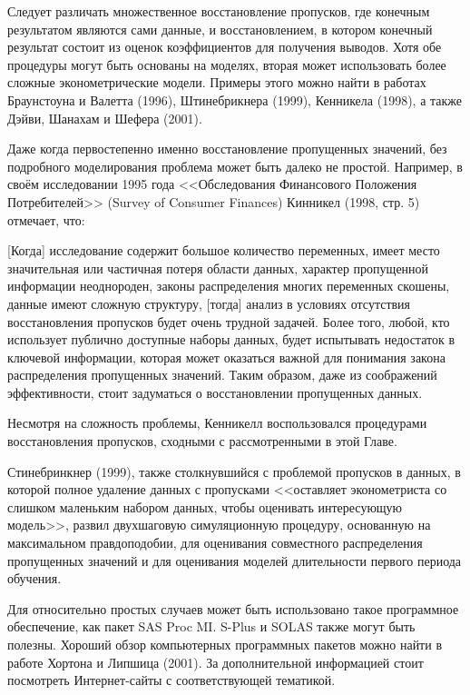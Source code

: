Следует различать множественное восстановление пропусков, где конечным результатом являются сами данные, и восстановлением, в котором конечный результат состоит из оценок коэффициентов для получения выводов. Хотя обе процедуры могут быть основаны на моделях, вторая может использовать более сложные эконометрические модели. Примеры этого можно найти в работах Браунстоуна и Валетта (1996), Штинебрикнера (1999), Кенникела (1998), а также Дэйви, Шанахам и Шефера (2001).

Даже когда первостепенно именно восстановление пропущенных значений, без подробного моделирования проблема может быть далеко не простой. Например, в своём исследовании 1995 года <<Обследования Финансового Положения Потребителей>> (Survey of Consumer Finances) Кинникел (1998, стр. 5) отмечает, что:

[Когда] исследование содержит большое количество переменных, имеет место значительная или частичная потеря области данных, характер пропущенной информации неоднороден, законы распределения многих переменных скошены, данные имеют сложную структуру, [тогда] анализ в условиях отсутствия восстановления пропусков будет очень трудной задачей. Более того, любой, кто использует публично доступные наборы данных, будет испытывать недостаток в ключевой информации, которая может оказаться важной для понимания закона распределения пропущенных значений. Таким образом, даже из соображений эффективности, стоит задуматься о  восстановлении пропущенных данных.

Несмотря на сложность проблемы, Кенникелл воспользовался процедурами восстановления пропусков, сходными с рассмотренными в этой Главе.

Стинебринкнер (1999), также столкнувшийся с проблемой пропусков в данных, в которой полное удаление данных с пропусками <<оставляет эконометриста со слишком маленьким набором данных, чтобы оценивать интересующую модель>>, развил двухшаговую симуляционную процедуру, основанную на максимальном правдоподобии, для оценивания совместного распределения пропущенных значений и для оценивания моделей длительности первого периода обучения.

Для относительно простых случаев может быть использовано такое программное обеспечение, как пакет SAS Proc MI. S-Plus и SOLAS также могут быть полезны. Хороший обзор компьютерных программных пакетов можно найти в работе  Хортона и Липшица (2001). За дополнительной информацией стоит посмотреть Интернет-сайты с соответствующей тематикой.

